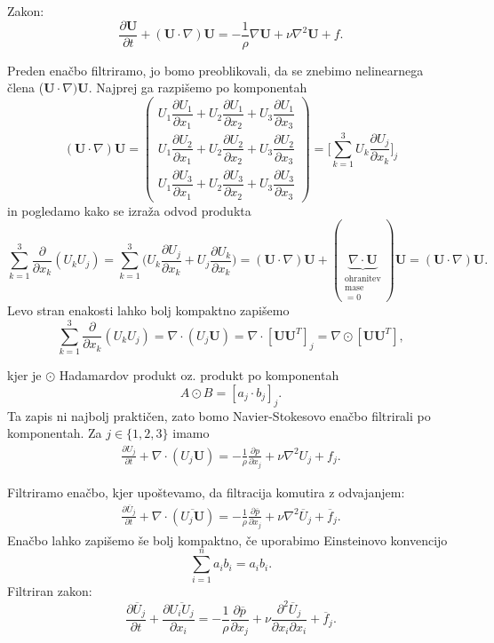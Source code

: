 \documentclass[mat2, tisk]{fmfdelo}
\newcommand{\bd}{\textbf}
\begin{document}
Zakon: 
$$
\frac{\partial \bd{U}}{\partial t} + (\bd{U}\cdot \nabla)\bd{U} = -\frac{1}{\rho} \nabla \bd{U} + \nu\nabla^2 \bd{U} + f.
$$

\noindent
Preden enačbo filtriramo, jo bomo preoblikovali, da se znebimo nelinearnega člena ($\bd{U}\cdot \nabla)\bd{U}$.
Najprej ga razpišemo po komponentah 
\renewcommand{\arraystretch}{2.5} %
\[
(\bd{U} \cdot \nabla) \bd{U} =
\begin{pmatrix}
U_1 \dfrac{\partial U_1}{\partial x_1} + U_2 \dfrac{\partial U_1}{\partial x_2} + U_3 \dfrac{\partial U_1}{\partial x_3} \\
U_1 \dfrac{\partial U_2}{\partial x_1} + U_2 \dfrac{\partial U_2}{\partial x_2} + U_3 \dfrac{\partial U_2}{\partial x_3} \\
U_1 \dfrac{\partial U_3}{\partial x_1} + U_2 \dfrac{\partial U_3}{\partial x_2} + U_3 \dfrac{\partial U_3}{\partial x_3}
\end{pmatrix} = \Big[\sum_{k=1}^3 U_k \frac{\partial U_j}{\partial x_k}\Big]_j
\]
in pogledamo kako se izraža odvod produkta
$$
\sum_{k=1}^3 \frac{\partial}{\partial x_k} (U_k U_j) = \sum_{k=1}^3 \Big(U_k\frac{\partial U_j}{\partial x_k}
+ U_j\frac{\partial U_k}{\partial x_k}\Big) = (\bd{U}\cdot \nabla)\bd{U} + (\underbrace{\nabla\cdot \bd{U}}_{\substack{\text{ohranitev}\\{\text{mase}}\\=0}}) \bd{U}
= (\bd{U}\cdot \nabla)\bd{U}.
$$
Levo stran enakosti lahko bolj kompaktno zapišemo
$$
\sum_{k=1}^3 \frac{\partial}{\partial x_k} (U_k U_j) = \nabla \cdot (U_j \bd{U}) = 
\nabla \cdot [\bd{U} \bd{U}^T]_{j} = \nabla \odot [\bd{U} \bd{U}^T],
$$

kjer je $\odot$ Hadamardov produkt oz. produkt po komponentah 
\[
A \odot B = \left[ a_j \cdot b_j \right]_j.
\]
Ta zapis ni najbolj praktičen, zato bomo Navier-Stokesovo enačbo filtrirali po komponentah.
Za $j\in \{1, 2, 3\}$ imamo 
\begin{align*}
\frac{\partial U_j}{\partial t} + \nabla\cdot(U_j \bd{U}) = -\frac{1}{\rho} \frac{\partial p}{\partial x_j} + \nu\nabla^2 U_j + f_j.
\end{align*}

Filtriramo enačbo, kjer upoštevamo, da filtracija komutira z odvajanjem:
\begin{align*}
  \frac{\partial \overline{U}_j}{\partial t} + \nabla\cdot(\overline{U_j \bd{U}}) = -\frac{1}{\rho} \frac{\partial \overline{p}}{\partial x_j} + \nu\nabla^2 \overline{U}_j + \overline{f}_j.
\end{align*}
Enačbo lahko zapišemo še bolj kompaktno, če uporabimo Einsteinovo konvencijo 
$$
\sum_{i=1}^n a_i b_i = a_i b_i.
$$
Filtriran zakon:
\begin{equation}
\frac{\partial \overline{U}_j}{\partial t} + \frac{\partial \overline{U_i U_j}}{\partial x_i} = -\frac{1}{\rho} \frac{\partial \overline{p}}{\partial x_j} + \nu \frac{\partial^2 \overline{U}_j}{\partial x_i \partial x_i} + \overline{f}_j.
\end{equation}
\end{document}
